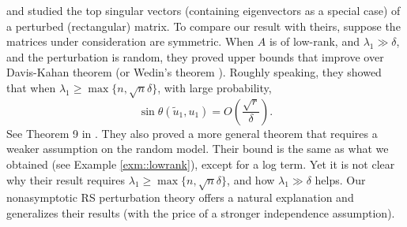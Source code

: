 \documentclass[12pt]{article}%
\theoremstyle{plain}%
\theoremstyle{remark}
\begin{document}



\cite{Vu11} and \cite{ORVuWan13} studied the top singular vectors (containing eigenvectors as a special case) of a perturbed (rectangular) matrix. To compare our result with theirs, suppose the matrices under consideration are symmetric. When $A$ is of low-rank, and $\lambda_1 \gg \delta$, and the perturbation is random, they proved upper bounds that improve over Davis-Kahan theorem (or Wedin's theorem \citep{Wed72}). Roughly speaking, they showed that when $\lambda_1 \ge \max\{n, \sqrt{n}\delta\}$, with large probability,
\begin{equation*}
\sin \theta(\tilde{u}_1, u_1) = O(\frac{\sqrt{r}}{\delta}).
\end{equation*}
See Theorem 9 in \cite{ORVuWan13}. They also proved a more general theorem that requires a weaker assumption on the random model. Their bound is the same as what we obtained (see Example \ref{exm::lowrank}), except for a log term.  Yet it is not clear why their result requires $\lambda_1 \ge \max\{n, \sqrt{n}\delta\}$, and how $\lambda_1 \gg \delta$ helps. Our nonasymptotic RS perturbation theory offers a natural explanation and generalizes their results (with the price of a stronger independence assumption). %
\end{document}
